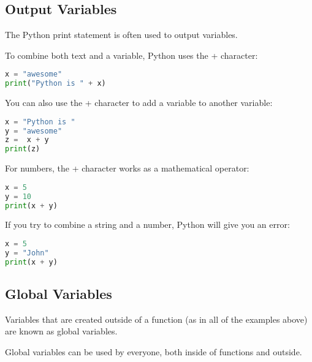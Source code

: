 \documentclass[12pt]{book}
\begin{document}
\subsection{Output Variables}

The Python print statement is often used to output variables.

To combine both text and a variable, Python uses the + character:



\lstset{style=mystyle}
\begin{lstlisting}[language=Python, caption=Python example]
x = "awesome"
print("Python is " + x)
\end{lstlisting}



You can also use the + character to add a variable to another variable:



\lstset{style=mystyle}
\begin{lstlisting}[language=Python, caption=Python example]
x = "Python is "
y = "awesome"
z =  x + y
print(z)
\end{lstlisting}




For numbers, the + character works as a mathematical operator:



\lstset{style=mystyle}
\begin{lstlisting}[language=Python, caption=Python example]
x = 5
y = 10
print(x + y)
\end{lstlisting}



If you try to combine a string and a number, Python will give you an error:



\lstset{style=mystyle}
\begin{lstlisting}[language=Python, caption=Python example]
x = 5
y = "John"
print(x + y)
\end{lstlisting}




\subsection{Global Variables}

Variables that are created outside of a function (as in all of the examples above) are known as global variables.

Global variables can be used by everyone, both inside of functions and outside.
\end{document}

